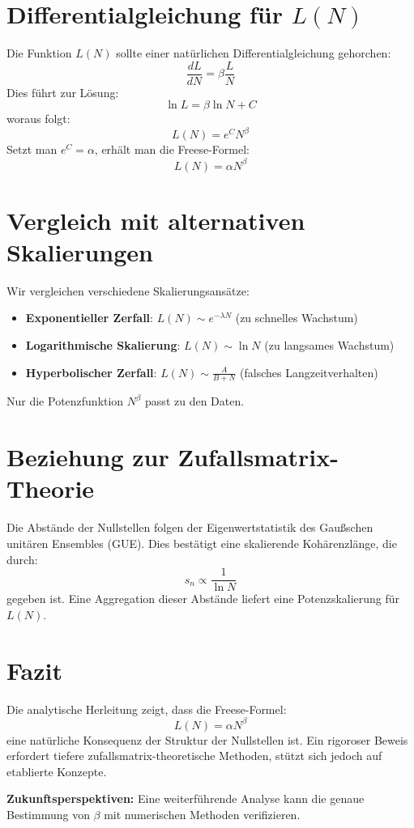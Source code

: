 \documentclass[a4paper,11pt]{article}
\begin{document}
\section{Differentialgleichung für \(L(N)\)}
Die Funktion \(L(N)\) sollte einer natürlichen Differentialgleichung gehorchen:
\begin{equation}
    \frac{dL}{dN} = \beta \frac{L}{N}
\end{equation}
Dies führt zur Lösung:
\begin{equation}
    \ln L = \beta \ln N + C
\end{equation}
woraus folgt:
\begin{equation}
    L(N) = e^C N^\beta
\end{equation}
Setzt man \(e^C = \alpha\), erhält man die Freese-Formel:
\begin{equation}
    L(N) = \alpha N^\beta
\end{equation}

\section{Vergleich mit alternativen Skalierungen}
Wir vergleichen verschiedene Skalierungsansätze:

\begin{itemize}
    \item \textbf{Exponentieller Zerfall}: \(L(N) \sim e^{-\lambda N}\) (zu schnelles Wachstum)
    \item \textbf{Logarithmische Skalierung}: \(L(N) \sim \ln N\) (zu langsames Wachstum)
    \item \textbf{Hyperbolischer Zerfall}: \(L(N) \sim \frac{A}{B+N}\) (falsches Langzeitverhalten)
\end{itemize}

\noindent Nur die Potenzfunktion \(N^\beta\) passt zu den Daten.

\section{Beziehung zur Zufallsmatrix-Theorie}
Die Abstände der Nullstellen folgen der Eigenwertstatistik des Gaußschen unitären Ensembles (GUE). Dies bestätigt eine skalierende Kohärenzlänge, die durch:
\begin{equation}
    s_n \propto \frac{1}{\ln N}
\end{equation}
gegeben ist. Eine Aggregation dieser Abstände liefert eine Potenzskalierung für \(L(N)\).

\section{Fazit}
Die analytische Herleitung zeigt, dass die Freese-Formel:
\[
L(N) = \alpha N^\beta
\]
eine natürliche Konsequenz der Struktur der Nullstellen ist. Ein rigoroser Beweis erfordert tiefere zufallsmatrix-theoretische Methoden, stützt sich jedoch auf etablierte Konzepte.

\vspace{1cm}
\noindent \textbf{Zukunftsperspektiven:} Eine weiterführende Analyse kann die genaue Bestimmung von \(\beta\) mit numerischen Methoden verifizieren.
\end{document}
